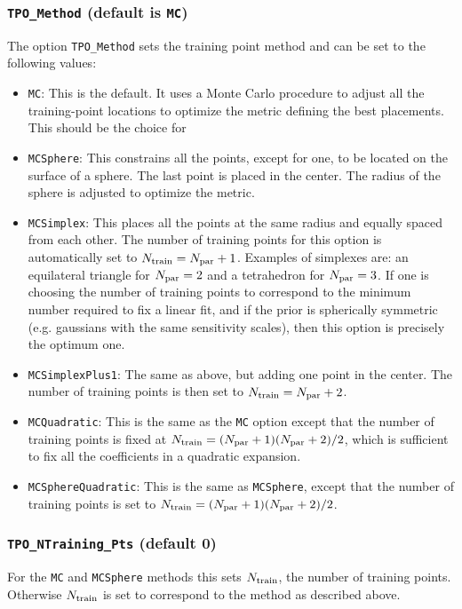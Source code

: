 \documentclass[UserManual.tex]{subfiles}
\begin{document}
\subsubsection{{\tt TPO\_Method} (default is {\tt MC})}
The option {\tt TPO\_Method} sets the training point method and can be set to the following values:
\begin{itemize}\itemsep 0pt
\item {\tt MC}: This is the default. It uses a Monte Carlo procedure to adjust all the training-point locations to optimize the metric defining the best placements. This should be the choice for 
\item {\tt MCSphere}: This constrains all the points, except for one, to be located on the surface of a sphere. The last point is placed in the center. The radius of the sphere is adjusted to optimize the metric.
\item {\tt MCSimplex}: This places all the points at the same radius and equally spaced from each other. The number of training points for this option is automatically set to $N_{\rm train}=N_{\rm par}+1$. Examples of simplexes are: an equilateral triangle for $N_{\rm par}=2$ and a tetrahedron for $N_{\rm par}=3$. If one is choosing the number of training points to correspond to the minimum number required to fix a linear fit, and if the prior is spherically symmetric (e.g. gaussians with the same sensitivity scales), then this option is precisely the optimum one.
\item {\tt MCSimplexPlus1}: The same as above, but adding one point in the center. The number of training points is then set to $N_{\rm train}=N_{\rm par}+2$. 
\item {\tt MCQuadratic}: This is the same as the {\tt MC} option except that the number of training points is fixed at $N_{\rm train}=(N_{\rm par}+1)(N_{\rm par}+2)/2$, which is sufficient to fix all the coefficients in a quadratic expansion.
\item {\tt MCSphereQuadratic}: This is the same as {\tt MCSphere}, except that the number of training points is set to $N_{\rm train}=(N_{\rm par}+1)(N_{\rm par}+2)/2$.
\end{itemize}

\subsubsection{{\tt TPO\_NTraining\_Pts} (default 0)}
For the {\tt MC} and {\tt MCSphere} methods this sets $N_{\rm train}$, the number of training points. Otherwise $N_{\rm train}$ is set to correspond to the method as described above.
\end{document}
